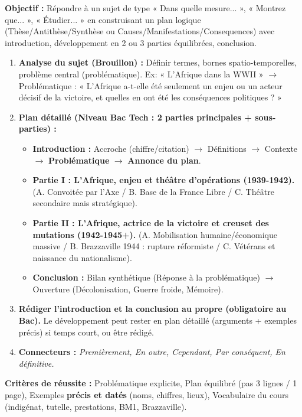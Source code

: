 \documentclass[11pt]{article}
\newcommand{\cle}[1]{{\popxbold\color{popdark}#1}}
\begin{document}
\begin{methode}
\textbf{Objectif :} Répondre à un sujet de type « Dans quelle mesure... », « Montrez que... », « Étudier... » en construisant un plan logique (Thèse/Antithèse/Synthèse ou Causes/Manifestations/Consequences) avec introduction, développement en 2 ou 3 parties équilibrées, conclusion.
\begin{enumerate}
    \item \textbf{Analyse du sujet (Brouillon) :} Définir termes, bornes spatio-temporelles, problème central (problématique). Ex: « L'Afrique dans la WWII » $\rightarrow$ Problématique : « L'Afrique a-t-elle été seulement un enjeu ou un acteur décisif de la victoire, et quelles en ont été les conséquences politiques ? »
    \item \textbf{Plan détaillé (Niveau Bac Tech : 2 parties principales + sous-parties) :}
    \begin{itemize}
        \item \textbf{Introduction :} Accroche (chiffre/citation) $\rightarrow$ Définitions $\rightarrow$ Contexte $\rightarrow$ \textbf{Problématique} $\rightarrow$ \textbf{Annonce du plan}.
        \item \textbf{Partie I : L'Afrique, enjeu et théâtre d'opérations (1939-1942).} (A. Convoitée par l'Axe / B. Base de la France Libre / C. Théâtre secondaire mais stratégique).
        \item \textbf{Partie II : L'Afrique, actrice de la victoire et creuset des mutations (1942-1945+).} (A. Mobilisation humaine/économique massive / B. Brazzaville 1944 : rupture réformiste / C. Vétérans et naissance du nationalisme).
        \item \textbf{Conclusion :} Bilan synthétique (Réponse à la problématique) $\rightarrow$ Ouverture (Décolonisation, Guerre froide, Mémoire).
    \end{itemize}
    \item \textbf{Rédiger l'introduction et la conclusion au propre (obligatoire au Bac).} Le développement peut rester en plan détaillé (arguments + exemples précis) si temps court, ou être rédigé.
    \item \textbf{Connecteurs :} \textit{Premièrement, En outre, Cependant, Par conséquent, En définitive.}
\end{enumerate}
\textbf{Critères de réussite :} Problématique explicite, Plan équilibré (pas 3 lignes / 1 page), Exemples \textbf{précis et datés} (noms, chiffres, lieux), Vocabulaire du cours (\cle{indigénat}, \cle{tutelle}, \cle{prestations}, \cle{BM1}, \cle{Brazzaville}).
\end{methode}
\end{document}
